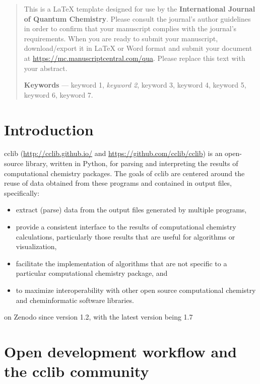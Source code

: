 \documentclass[num-refs]{wiley-article}
\begin{document}
\maketitle
{}
\begin{abstract}
This is a LaTeX template designed for use by the \textbf{International Journal of Quantum Chemistry}. Please consult the journal's author guidelines in order to confirm that your manuscript complies with the journal's requirements. When you are ready to submit your manuscript, download/export it in LaTeX or Word format and submit your document at \href{https://mc.manuscriptcentral.com/qua}{https://mc.manuscriptcentral.com/qua}. Please replace this text with your abstract.

\textbf{Keywords} --- keyword 1, \emph{keyword 2}, keyword 3, keyword 4, keyword 5, keyword 6, keyword 7.
\end{abstract}

\section{Introduction}

cclib\cite{Oboyle2008} (\url{http://cclib.github.io/} and \url{https://github.com/cclib/cclib}) is an open-source library, written in Python, for parsing and interpreting the results of computational chemistry packages.  The goals of cclib are centered around the reuse of data obtained from these programs and contained in output files, specifically:
\begin{itemize}
\item extract (parse) data from the output files generated by multiple programs,
\item provide a consistent interface to the results of computational chemistry calculations, particularly those results that are useful for algorithms or visualization,
\item facilitate the implementation of algorithms that are not specific to a particular computational chemistry package, and
\item to maximize interoperability with other open source computational chemistry and cheminformatic software libraries.
\end{itemize}

on Zenodo since version 1.2\cite{Langner2014}, with the latest version being 1.7\cite{Berquist2021}

\section{Open development workflow and the cclib community}
\end{document}
